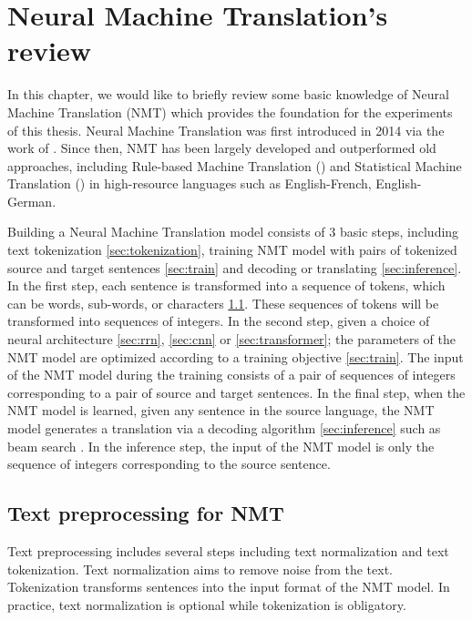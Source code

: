 \chapter{Neural Machine Translation’s review}
In this chapter, we would like to briefly review some basic knowledge of Neural Machine Translation (NMT) which provides the foundation for the experiments of this thesis. Neural Machine Translation was first introduced in 2014 via the work of \cite{Bahdanau15learning,Cho14properties}. Since then, NMT has been largely developed and outperformed old approaches, including Rule-based Machine Translation () and Statistical Machine Translation () in high-resource languages such as English-French, English-German.

Building a Neural Machine Translation model consists of 3 basic steps, including text tokenization \ref{sec:tokenization}, training NMT model with pairs of tokenized source and target sentences \ref{sec:train} and decoding or translating \ref{sec:inference}. In the first step, each sentence is transformed into a sequence of tokens, which can be words, sub-words, or characters \ref{sec:preprocessing}. These sequences of tokens will be transformed into sequences of integers. In the second step, given a choice of neural architecture \ref{sec:rrn}, \ref{sec:cnn} or \ref{sec:transformer}; the parameters of the NMT model are optimized according to a training objective \ref{sec:train}. The input of the NMT model during the training consists of a pair of sequences of integers corresponding to a pair of source and target sentences. In the final step, when the NMT model is learned, given any sentence in the source language, the NMT model generates a translation via a decoding algorithm \ref{sec:inference} such as beam search \citep{Koehn04pharaoh}. In the inference step, the input of the NMT model is only the sequence of integers corresponding to the source sentence.

\section{Text preprocessing for NMT \label{sec:tokenization}} \label{sec:preprocessing}
Text preprocessing includes several steps including text normalization and text tokenization. Text normalization aims to remove noise from the text. Tokenization transforms sentences into the input format of the NMT model. In practice, text normalization is optional while tokenization is obligatory.

